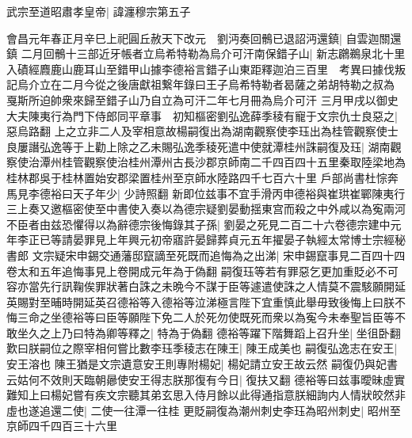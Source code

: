 武宗至道昭肅孝皇帝|{
	諱瀍穆宗第五子}


會昌元年春正月辛巳上祀圓丘赦天下改元　劉沔奏回鶻已退詔沔還鎮|{
	自雲迦關還鎮}
二月回鶻十三部近牙帳者立烏希特勒為烏介可汗南保錯子山|{
	新志鸊鵜泉北十里入磧經麚鹿山鹿耳山至錯甲山據李德裕言錯子山東距釋迦泊三百里　考異曰據伐叛記烏介立在二月今從之後唐獻祖繋年錄曰王子烏希特勒者曷薩之弟胡特勒之叔為戛斯所迫帥衆來歸至錯子山乃自立為可汗二年七月冊為烏介可汗}
三月甲戌以御史大夫陳夷行為門下侍郎同平章事　初知樞密劉弘逸薛季稜有寵于文宗仇士良惡之|{
	惡烏路翻}
上之立非二人及宰相意故楊嗣復出為湖南觀察使李珏出為桂管觀察使士良屢譖弘逸等于上勸上除之乙未賜弘逸季稜死遣中使就潭桂州誅嗣復及珏|{
	湖南觀察使治潭州桂管觀察使治桂州潭州古長沙郡京師南二千四百四十五里秦取陸梁地為桂林郡吳于桂林置始安郡梁置桂州至京師水陸路四千七百六十里}
戶部尚書杜悰奔馬見李德裕曰天子年少|{
	少詩照翻}
新即位兹事不宜手滑丙申德裕與崔珙崔鄲陳夷行三上奏又邀樞密使至中書使入奏以為德宗疑劉晏動揺東宫而殺之中外咸以為寃兩河不臣者由兹恐懼得以為辭德宗後悔錄其子孫|{
	劉晏之死見二百二十六卷德宗建中元年李正已等請晏罪見上年興元初帝寤許晏歸葬貞元五年擢晏子執經太常博士宗經秘書郎}
文宗疑宋申錫交通藩邸竄謫至死既而追悔為之出涕|{
	宋申錫竄事見二百四十四卷太和五年追悔事見上卷開成元年為于偽翻}
嗣復珏等若有罪惡乞更加重貶必不可容亦當先行訊鞠俟罪狀著白誅之未晩今不謀于臣等遽遣使誅之人情莫不震駭願開延英賜對至晡時開延英召德裕等入德裕等泣涕極言陛下宜重慎此舉毋致後悔上曰朕不悔三命之坐德裕等曰臣等願陛下免二人於死勿使既死而衆以為寃今未奉聖旨臣等不敢坐久之上乃曰特為卿等釋之|{
	特為于偽翻}
德裕等躍下階舞蹈上召升坐|{
	坐徂卧翻}
歎曰朕嗣位之際宰相何嘗比數李珏季稜志在陳王|{
	陳王成美也}
嗣復弘逸志在安王|{
	安王溶也}
陳王猶是文宗遺意安王則專附楊妃|{
	楊妃請立安王故云然}
嗣復仍與妃書云姑何不效則天臨朝曏使安王得志朕那復有今日|{
	復扶又翻}
德裕等曰兹事曖昧虛實難知上曰楊妃嘗有疾文宗聽其弟玄思入侍月餘以此得通指意朕細詢内人情狀皎然非虛也遂追還二使|{
	二使一往潭一往桂}
更貶嗣復為潮州刺史李珏為昭州刺史|{
	昭州至京師四千四百三十六里}

